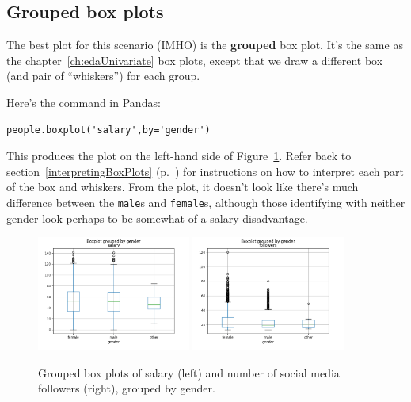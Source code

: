 \subsection{Grouped box plots}


The best plot for this scenario (IMHO) is the \textbf{grouped} box plot. It's
the same as the chapter~\ref{ch:edaUnivariate} box plots, except that we draw a
different box (and pair of ``whiskers'') for each group.

Here's the command in Pandas:

\begin{Verbatim}[fontsize=\small,samepage=true,frame=single,framesep=3mm]
people.boxplot('salary',by='gender')
\end{Verbatim}

This produces the plot on the left-hand side of Figure~\ref{fig:genderPlots}.
Refer back to section~\ref{interpretingBoxPlots}
(p.~\pageref{interpretingBoxPlots}) for instructions on how to interpret each
part of the box and whiskers. From the plot, it doesn't look like there's much
difference between the \texttt{male}s and \texttt{female}s, although those
identifying with neither gender look perhaps to be somewhat of a salary
disadvantage.

\begin{figure}[ht]
\centering
\includegraphics[width=0.45\textwidth]{genderSalary.png}
\includegraphics[width=0.45\textwidth]{genderFollowers.png}
\caption{Grouped box plots of salary (left) and number of social media
followers (right), grouped by gender.}
\label{fig:genderPlots}
\end{figure}

